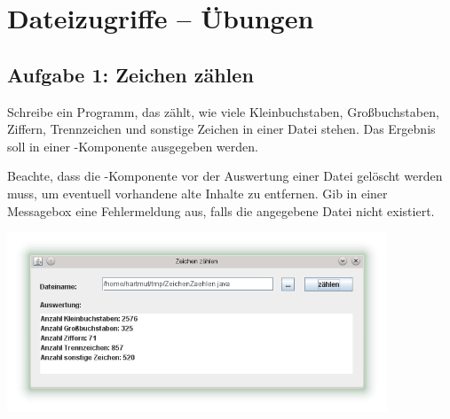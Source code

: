 \clearpage

\rehead[]{\textcolor{lightblue}{AvHG, Inf, My}}
\lohead[]{\textcolor{lightblue}{AvHG, Inf, My}}

\section{Dateizugriffe -- Übungen}

\subsection{Aufgabe 1: Zeichen zählen}

Schreibe ein Programm, das zählt, wie viele Kleinbuchstaben, Großbuchstaben,
Ziffern, Trennzeichen und sonstige Zeichen in einer Datei stehen. Das Ergebnis
soll in einer -Komponente ausgegeben werden.

Beachte, dass die -Komponente vor der Auswertung einer Datei
gelöscht werden muss, um eventuell vorhandene alte Inhalte zu entfernen. Gib in einer
Messagebox eine Fehlermeldung aus, falls die angegebene Datei nicht existiert.

\begin{center}
\includegraphics[width=0.85\textwidth]{./inf/SEKII/27_Java_Dateizugriffe/ZeichenZaehlen.png}
\end{center}

